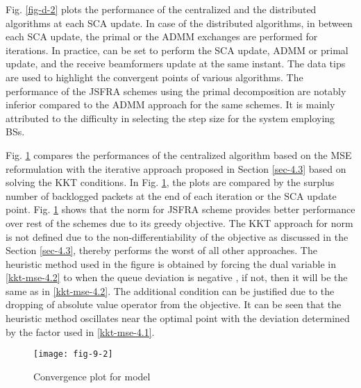 Fig. \ref{fig-d-2} plots the performance of the centralized and the distributed algorithms at each \ac{SCA} update. In case of the distributed algorithms, in between each \ac{SCA} update, the primal or the \ac{ADMM} exchanges are performed for  iterations. In practice,  can be set to perform the \ac{SCA} update, \ac{ADMM} or primal update, and the receive beamformers  update at the same instant. The data tips are used to highlight the convergent points of various algorithms. The performance of the \ac{JSFRA} schemes using the primal decomposition are notably inferior compared to the \ac{ADMM} approach for the same schemes. It is mainly attributed to the difficulty in selecting the step size for the system employing  \acp{BS}.

Fig. \ref{fig-d-3.1} compares the performances of the centralized algorithm based on the \ac{MSE} reformulation with the iterative approach proposed in Section \ref{sec-4.3} based on solving the \ac{KKT} conditions. In Fig. \ref{fig-d-3.1}, the plots are compared by the surplus number of backlogged packets at the end of each iteration or the \ac{SCA} update point. Fig. \ref{fig-d-3.1} shows that the  norm for \ac{JSFRA} scheme provides better performance over rest of the schemes due to its greedy objective. The \ac{KKT} approach for  norm is not defined due to the non-differentiability of the objective as discussed in the Section \ref{sec-4.3}, thereby performs the worst of all other approaches. The heuristic method used in the figure is obtained by forcing the dual variable  in \eqref{kkt-mse-4.2} to  when the queue deviation is negative , if not, then it will be the same as in \eqref{kkt-mse-4.2}. The additional condition can be justified due to the dropping of absolute value operator from the objective. It can be seen that the heuristic method oscillates near the optimal point with the deviation determined by the factor \me{\rho} used in \eqref{kkt-mse-4.1}.
\begin{figure}
\centering
\texttt{[image: fig-9-2]}
\caption{Convergence plot for  model}
\label{fig-d-3.1}
\end{figure}

